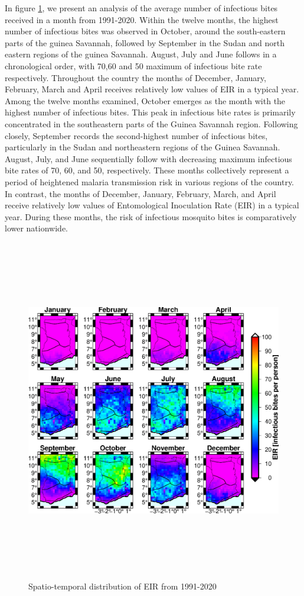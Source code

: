\documentclass[utf8]{FrontiersinHarvard} %
\begin{document}
In figure \ref{fig:3:7}, we present an analysis of the average number of infectious bites received in a month from 1991-2020. Within the twelve months, the highest number of infectious bites was observed in October, around the south-eastern parts of the guinea Savannah, followed by September in the Sudan and north eastern regions of the guinea Savannah. August, July and June follows in a chronological order, with 70,60 and 50 maximum of infectious bite rate respectively. Throughout the country the months of December, January, February, March and April receives relatively low values of EIR in a typical year. Among the twelve months examined, October emerges as the month with the highest number of infectious bites. This peak in infectious bite rates is primarily concentrated in the southeastern parts of the Guinea Savannah region. Following closely, September records the second-highest number of infectious bites, particularly in the Sudan and northeastern regions of the Guinea Savannah. August, July, and June sequentially follow with decreasing maximum infectious bite rates of 70, 60, and 50, respectively. These months collectively represent a period of heightened malaria transmission risk in various regions of the country. In contrast, the months of December, January, February, March, and April receive relatively low values of Entomological Inoculation Rate (EIR) in a typical year. During these months, the risk of infectious mosquito bites is comparatively lower nationwide.
\begin{figure}[ht]
\begin{center}
\includegraphics[width=15cm,height=15cm]{EIR_chirps_ERA5.eps}
\caption{Spatio-temporal distribution of EIR from 1991-2020}
\label{fig:3:7}
\end{center}
\end{figure}
\end{document}
